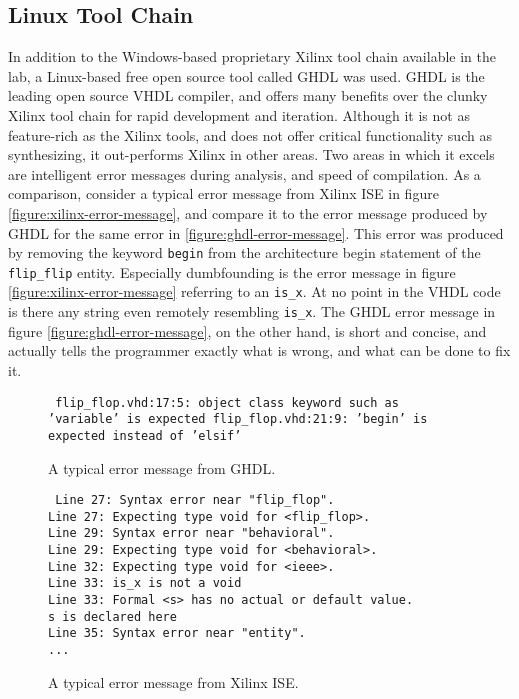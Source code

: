 \subsection{Linux Tool Chain}

In addition to the Windows-based proprietary Xilinx tool chain available in the lab\cn, a Linux-based free open source tool called GHDL was used.
GHDL is the leading open source VHDL compiler\cn, and offers many benefits over the clunky Xilinx tool chain for rapid development and iteration.
Although it is not as feature-rich as the Xilinx tools, and does not offer critical functionality such as synthesizing, it out-performs Xilinx in other areas.
Two areas in which it excels are intelligent error messages during analysis, and speed of compilation.
As a comparison, consider a typical error message from Xilinx ISE in figure \vref{figure:xilinx-error-message}, and compare it to the error message produced by GHDL for the same error in \vref{figure:ghdl-error-message}.
This error was produced by removing the keyword \texttt{begin} from the architecture begin statement of the \texttt{flip\_flip} entity.
Especially dumbfounding is the error message in figure \vref{figure:xilinx-error-message} referring to an \texttt{is\_x}.
At no point in the VHDL code is there any string even remotely resembling \texttt{is\_x}.
The GHDL error message in figure \vref{figure:ghdl-error-message}, on the other hand, is short and concise, and actually tells the programmer exactly what is wrong, and what can be done to fix it.

\begin{figure}
\texttt{
flip\_flop.vhd:17:5: object class keyword such as 'variable' is expected
flip\_flop.vhd:21:9: 'begin' is expected instead of 'elsif'
}
\begin{center}
\caption{A typical error message from GHDL.}
\label{figure:ghdl-error-message}
\end{center}
\end{figure}

\begin{figure}
\texttt{
Line 27: Syntax error near "flip\_flop".\\
Line 27: Expecting type  void for <flip\_flop>.\\
Line 29: Syntax error near "behavioral".\\
Line 29: Expecting type  void for <behavioral>.\\
Line 32: Expecting type  void for <ieee>.\\
Line 33: is\_x is not a  void\\
Line 33: Formal <s> has no actual or default value.\\
s is declared here\\
Line 35: Syntax error near "entity".\\
...\\
}
\begin{center}
\caption{A typical error message from Xilinx ISE.}
\label{figure:xilinx-error-message}
\end{center}
\end{figure}
